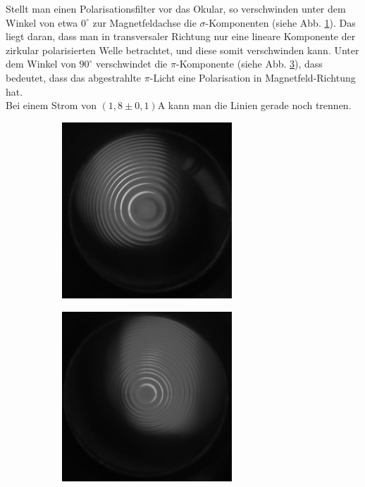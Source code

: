 Stellt man einen Polarisationsfilter vor das Okular, so verschwinden unter dem Winkel von etwa $0^\circ$ zur Magnetfeldachse die $\sigma$-Komponenten (siehe Abb. \ref{fig:bildtransmitBsigma}). Das liegt daran, dass man in transversaler Richtung nur eine lineare Komponente der zirkular polarisierten Welle betrachtet, und diese somit verschwinden kann. Unter dem Winkel von $90^\circ$ verschwindet die $\pi$-Komponente (siehe Abb. \ref{fig:bildtransmitBpi}), dass bedeutet, dass das abgestrahlte $\pi$-Licht eine Polarisation in Magnetfeld-Richtung hat.\\
Bei einem Strom von $\si{(1,8\pm 0,1)\ampere}$ kann man die Linien gerade noch trennen.

\begin{figure}[h]
  \centering
  \begin{subfigure}[h]{0.5\textwidth}
    \centering
    \includegraphics[width=0.7\textwidth]{data/bilder_okular/bild_3_edit.jpg}
    \label{fig:bildtransmitBsigma}
  \end{subfigure}%
  \begin{subfigure}[h]{0.5\textwidth}
    \centering
    \includegraphics[width=0.7\textwidth]{data/bilder_okular/bild_4_edit.jpg}
    \label{fig:bildtransmitBpi}
  \end{subfigure}
  \caption{}
\end{figure}

